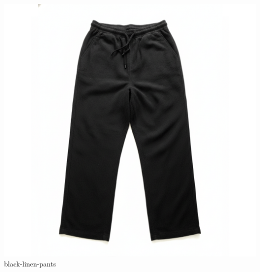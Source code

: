 \documentclass[10pt]{article}
\begin{document}
\begin{minipage}[t]{0.22\textwidth}\centering\vspace{0mm}
\includegraphics[width=\linewidth,keepaspectratio]{assets/pants/black-linen-pants.png}\\
\vspace{0.5mm}\tiny black-linen-pants\end{minipage}
\end{document}
